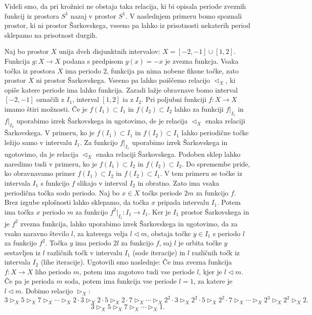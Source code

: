 \documentclass[mat2]{fmfdelo}
\begin{document}
Videli smo, da pri krožnici ne obstaja taka relacija, ki bi opisala periode zveznih funkcij iz prostora $S^1$ nazaj v prostor $S^1$. V naslednjem primeru bomo spoznali prostor, ki ni prostor Šarkovskega, vseeno pa lahko iz prisotnosti nekaterih period sklepamo na prisotnost durgih.
\begin{primer}
Naj bo prostor $X$ unija dveh disjunktnih intervalov: $X = [-2, -1] \cup [1, 2]$. Funkcija $g : X \to X$ podana s predpisom $g(x) = -x$ je zvezna funkcja. Vsaka točka iz prostora $X$ ima periodo 2, funkcija pa nima nobene fiksne točke, zato prostor $X$ ni prostor Šarkovskega. Vseeno pa lahko poiščemo relacijo $\triangleleft_X$, ki opiše katere periode ima lahko funkcija. Zaradi lažje obravnave bomo interval $[-2, -1]$ označili z $I_1$, interval $[1, 2]$ ia z $I_2$. Pri poljubni funkciji $f: X \to X$ imamo štiri možnosti. Če je $f(I_1) \subset I_1$ in $f(I_2) \subset I_2$ lahko za funkciji $f|_{I_1}$ in $f|_{I_2}$ uporabimo izrek Šarkovskega in ugotovimo, de je relacija $\triangleleft_X$ enaka relaciji Šarkovskega. V primeru, ko je $f(I_1) \subset I_1$ in $f(I_2) \subset I_1$ lahko periodične točke ležijo samo v intervalu $I_1$. Za funkcijo $f|_{I_1}$ uporabimo izrek Šarkovskega in ugotovimo, da je relacija $\triangleleft_X$ enaka relaciji Šarkovskega. Podoben sklep lahko naredimo tudi v primeru, ko je $f(I_1) \subset I_2$ in $f(I_2) \subset I_2$. Do spremembe pride, ko obravnavamo primer $f(I_1) \subset I_2$ in $f(I_2) \subset I_1$. V tem primeru se točke iz intervala $I_1$ s funkcijo $f$ slikajo v interval $I_2$ in obratno. Zato ima vsaka periodična točka sodo periodo. Naj bo $x \in X$ točks periode $2m$ za funkcijo $f$. Brez izgube splošnosti lahko sklepamo, da točka $x$ pripada intervalu $I_1$. Potem ima točka $x$ periodo $m$ za funkcijo $f^2|_{I_1} :I_1 \to I_1$. Ker je $I_1$ prostor Šarkovskega in je $f^2$ zvezna funkcija, lahko uporabimo izrek Šarkovskega in ugotovimo, da za vsako naravno število $l$, za katerega velja $l \triangleleft m$, obstaja točke $y \in I_1$ s periodo $l$ za funkcijo $f^2$. Točka $y$ ima periodo $2l$ za funkcijo $f$, saj $l$ je orbita točke $y$ sestavljen iz $l$ različnih točk v intervalu $I_1$ (sode iteracije) in $l$ različnih točk iz intervala $I_2$ (lihe iteracije). Ugotovili smo naslednje: Če ima zvezna funkcija $f:X \to X$ liho periodo $m$, potem ima zagotovo tudi vse periode $l$, kjer je $l \triangleleft m$. Če pa je perioda $m$ soda, potem ima funkcija vse periode $l=1$, za katere je $l \triangleleft m$.
Dobimo relacijo $\triangleright_X$:
$$3 \triangleright_X 5 \triangleright_X 7 \triangleright_X \cdots \triangleright_X 2\cdot 3 \triangleright_X 2\cdot 5 \triangleright_X 2\cdot 7 \triangleright_X \cdots \triangleright_X 2^2\cdot 3 \triangleright_X 2^2\cdot 5 \triangleright_X 2^2\cdot 7 \triangleright_X \cdots \triangleright_X 2^3 \triangleright_X 2^2 \triangleright_X 2.$$
$$3 \triangleright_X 5 \triangleright_X 7 \triangleright_X \cdots \triangleright_X 1.$$
\end{primer}
\end{document}
